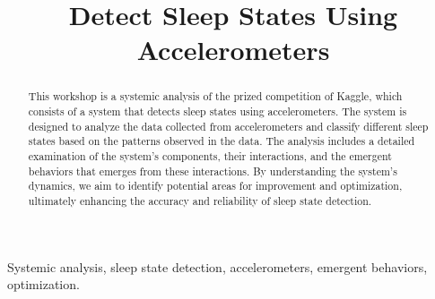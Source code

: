 \documentclass[conference]{IEEEtran}
\begin{document}
\title{Detect Sleep States Using Accelerometers}

\author{
    \and
    \and
    \centering 
}

\maketitle

\begin{abstract}
This workshop is a systemic analysis of the prized competition of Kaggle, which consists of a system that detects
sleep states using accelerometers. The system is designed to analyze the data collected from accelerometers and
classify different sleep states based on the patterns observed in the data. The analysis includes a detailed examination
of the system's components, their interactions, and the emergent behaviors that emerges from these interactions.
By understanding the system's dynamics, we aim to identify potential areas for improvement and optimization, 
ultimately enhancing the accuracy and reliability of sleep state detection.
\end{abstract}

\begin{IEEEkeywords}
Systemic analysis, sleep state detection, accelerometers, emergent behaviors, optimization.
\end{IEEEkeywords}
\end{document}
